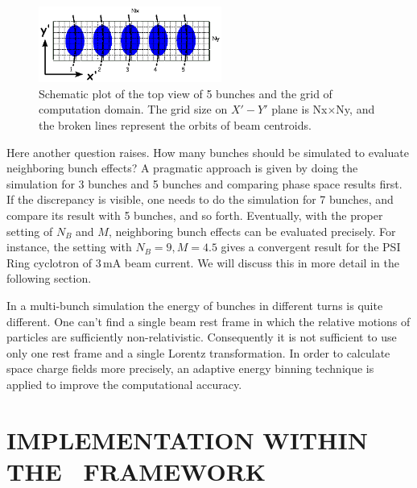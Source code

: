 \documentclass{JAC2003}
\begin{document}
\begin{figure}

  \centering
  \includegraphics[width=60mm]{figures/SM-MultiBunch.ps}
  \caption{Schematic plot of the top view of 5 bunches and the grid of computation domain. The grid size on $X'-Y'$ plane is Nx$\times$Ny, and the broken lines represent the orbits of beam centroids. }
  \label{fig:MultiBunch}
\end{figure}

Here another question raises. How many bunches should be simulated to evaluate neighboring bunch effects?  
A pragmatic approach is given by doing the simulation for 3 bunches and 5 bunches and comparing phase space results first. If the discrepancy is visible, one needs to do 
the simulation for 7 bunches, and compare its result with 5 bunches, and so forth. 
Eventually, with the proper setting of $N_B$ and $M$, neighboring bunch effects can be evaluated precisely.
For instance, the setting with $N_B=9, M=4.5$ gives a convergent result for the PSI Ring cyclotron of 3\,mA beam current.
We will discuss this in more detail in the following section. 

In a multi-bunch simulation the energy of bunches in different turns is quite different. One can't find a single beam rest frame in which the relative motions of 
particles are sufficiently non-relativistic. Consequently it is not sufficient to use only one rest frame 
and a single Lorentz transformation. In order to calculate space charge fields more precisely, an adaptive energy binning technique is applied to improve 
the computational accuracy. 

\section{IMPLEMENTATION WITHIN THE \opal \  FRAMEWORK}
\end{document}
